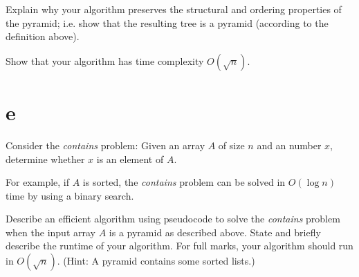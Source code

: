 \documentclass[12pt]{article}
\begin{document}
\begin{itemize}
		Explain why your algorithm preserves the structural and ordering properties
		of the pyramid; i.e. show that the resulting tree is a pyramid (according to
		the definition above).
		
		Show that your algorithm has time complexity $O(\sqrt{n})$.
		
		\part{e}
		Consider the \emph{contains} problem: Given an array $A$ of size $n$
		and an number $x$, determine whether $x$ is an element of $A$.
		
		For example, if $A$ is sorted, the \emph{contains} problem can be solved in
		$O(\log n)$ time by using a binary search.
		
		Describe an efficient algorithm using pseudocode to solve the \emph{contains} problem when the input array $A$ is a pyramid as described above.  
		State and briefly describe the runtime of your algorithm.
		For full marks, your algorithm should run in $O(\sqrt{n})$.
		(Hint: A pyramid contains some sorted lists.)
		
	\end{itemize}
	\begin{center}
	\end{center}
	
	
	
\end{document}
